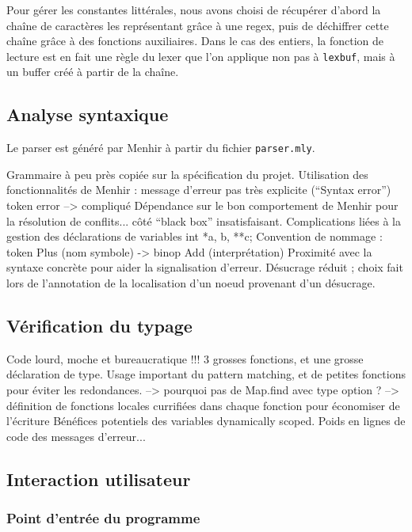 \documentclass[a4paper, 11pt]{article}
\begin{document}
Pour gérer les constantes littérales, nous avons choisi de récupérer d'abord la chaîne
de caractères les représentant grâce à une regex, puis de déchiffrer cette chaîne grâce
à des fonctions auxiliaires. Dans le cas des entiers, la fonction de lecture est en fait
une règle du lexer que l'on applique non pas à \texttt{lexbuf}, mais à un buffer créé
à partir de la chaîne.

\subsection{Analyse syntaxique}

Le parser est généré par Menhir à partir du fichier \texttt{parser.mly}.

Grammaire à peu près copiée sur la spécification du projet.
Utilisation des fonctionnalités de Menhir :
message d'erreur pas très explicite (``Syntax error'')
token error --> compliqué
Dépendance sur le bon comportement de Menhir pour la résolution de conflits...
côté ``black box'' insatisfaisant.
Complications liées à la gestion des déclarations de variables
int *a, b, **c;
Convention de nommage : token Plus (nom symbole) -> binop Add (interprétation)
Proximité avec la syntaxe concrète pour aider la signalisation d'erreur.
Désucrage réduit ; choix fait lors de l'annotation de la localisation
d'un noeud provenant d'un désucrage.

\subsection{Vérification du typage}

Code lourd, moche et bureaucratique !!!
3 grosses fonctions, et une grosse déclaration de type.
Usage important du pattern matching, et de petites fonctions pour éviter les redondances.
--> pourquoi pas de Map.find avec type option ?
--> définition de fonctions locales currifiées dans chaque fonction pour
  économiser de l'écriture
Bénéfices potentiels des variables dynamically scoped.
Poids en lignes de code des messages d'erreur...

\subsection{Interaction utilisateur}

\subsubsection{Point d'entrée du programme}
\end{document}

